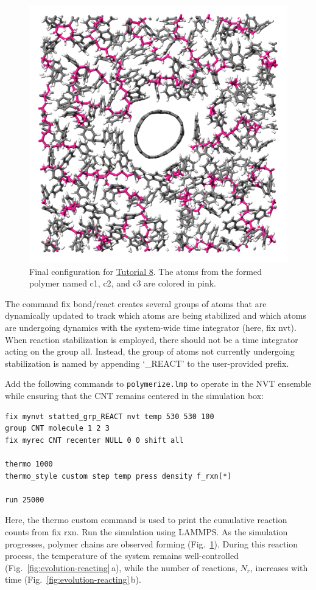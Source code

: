 \documentclass[9pt,tutorial]{livecoms}
\newcommand{\lmpcmd}[1]{\hspace{0pt}\colorbox{listing}{\textcolor{command}{\small{#1}}}\hspace{0pt}} %
\newcommand{\flecmd}[1]{\textcolor{command}{\texttt{#1}}} %
\begin{document}
\begin{figure}
\centering
\includegraphics[width=\linewidth]{REACT-final.png}
\caption{Final configuration for \hyperref[bond-react-label]{Tutorial 8}.
The atoms from the formed polymer named \lmpcmd{c1}, \lmpcmd{c2}, and
\lmpcmd{c3} are colored in pink.}
\label{fig:REACT-final}
\end{figure}

\begin{note}
The command \lmpcmd{fix bond/react} creates several groups of atoms that are dynamically updated
to track which atoms are being stabilized and which atoms are undergoing
dynamics with the system-wide time integrator (here, \lmpcmd{fix nvt}).
When reaction stabilization is employed, there should not be a time integrator acting on
the group \mbox{\lmpcmd{all}.}  Instead, the group of atoms not currently
undergoing stabilization is named by appending `\_REACT' to the user-provided prefix.
\end{note}

Add the following commands to \flecmd{polymerize.lmp} to operate in the NVT ensemble
while ensuring that the CNT remains centered in the simulation box:
\begin{lstlisting}
fix mynvt statted_grp_REACT nvt temp 530 530 100
group CNT molecule 1 2 3
fix myrec CNT recenter NULL 0 0 shift all

thermo 1000
thermo_style custom step temp press density f_rxn[*]

run 25000
\end{lstlisting}
Here, the \lmpcmd{thermo custom} command is used
to print the cumulative reaction counts from \lmpcmd{fix rxn}.
Run the simulation using LAMMPS.  As the simulation progresses, polymer chains are
observed forming (Fig.~\ref{fig:REACT-final}).  During this reaction process, the
temperature of the system remains well-controlled (Fig.~\ref{fig:evolution-reacting}\,a),
while the number of reactions, $N_r$, increases with time (Fig.~\ref{fig:evolution-reacting}\,b).
\end{document}
